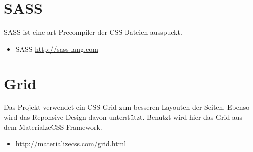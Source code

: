 \documentclass[Info_VK_Website_Dokumentation.tex]{subfiles}
\begin{document}
\section{SASS}

SASS ist eine art Precompiler der CSS Dateien ausspuckt.

\begin{itemize}
	\item SASS \url{http://sass-lang.com} 
\end{itemize}

\section{Grid}

Das Projekt verwendet ein CSS Grid zum besseren Layouten der Seiten. Ebenso wird das Reponsive Design davon unterstützt. Benutzt wird hier das Grid aus dem MaterialzeCSS Framework.

\begin{itemize}
 	\item \url{http://materializecss.com/grid.html} 
\end{itemize} 
\end{document}
